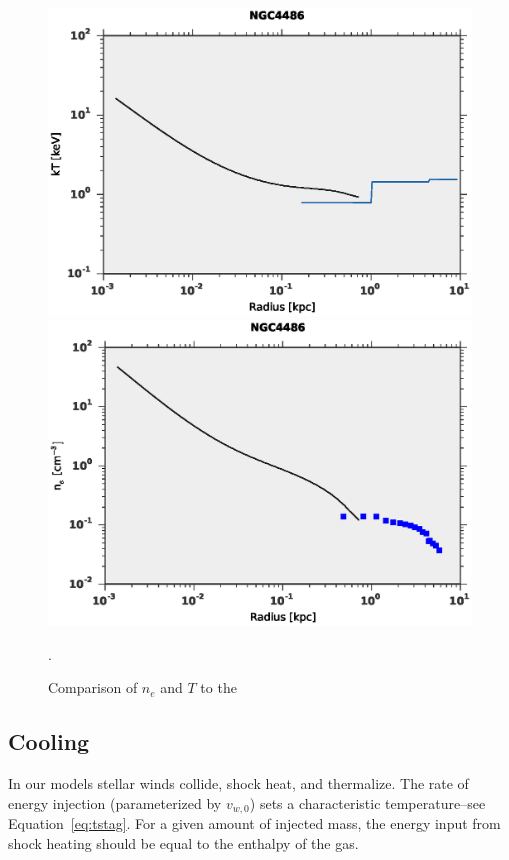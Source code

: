 \documentclass[usenatbib,fleqn]{mn2e}
\newcommand{\vwO}{v_{w,0}}
\begin{document}
\begin{figure}
\includegraphics[width=\columnwidth]{T_compare.eps}
\includegraphics[width=\columnwidth]{dens_compare.eps}
\caption{\label{fig:allen_compare} Comparison of $n_e$ and $T$ to the \citealt{AllenDunn+:2006a}}. 
\end{figure}


 
\subsection{Cooling}
\label{sec:cooling}
In our models stellar winds collide, shock heat, and thermalize. The rate of energy injection (parameterized by $\vwO$) sets a characteristic temperature--see Equation~\ref{eq:tstag}.  For a given amount of injected mass, the energy input from shock heating should be equal to the enthalpy of the gas.
\end{document}
